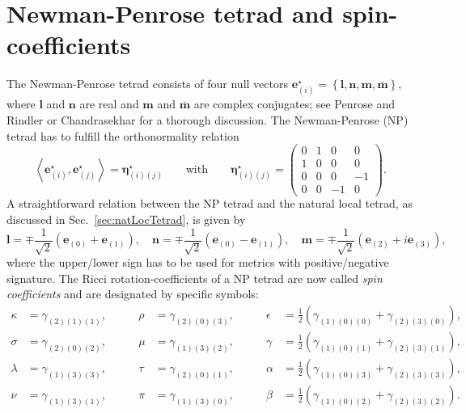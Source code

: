 \documentclass[10pt,twoside,notitlepage,a4paper,fleqn,openbib]{report}
\begin{document}
\section{Newman-Penrose tetrad and spin-coefficients}\label{sec:newmanPenrose}
\setcounter{equation}{0}
The Newman-Penrose tetrad consists of four null vectors $\mathbf{e}^{\star}_{(i)}=\left\{\mathbf{l}, \mathbf{n}, \mathbf{m}, \mathbf{\bar{m}}\right\}$, where $\mathbf{l}$ and $\mathbf{n}$ are real and $\mathbf{m}$ and $\mathbf{\bar{m}}$ are complex conjugates; see Penrose and Rindler\cite{penroseRindler} or Chandrasekhar\cite{chandrasekhar2006} for a thorough discussion. The Newman-Penrose (NP) tetrad has to fulfill the orthonormality relation
\begin{equation}
  \left<\mathbf{e}^{\star}_{(i)},\mathbf{e}^{\star}_{(j)}\right> = \boldsymbol{\eta}^{\star}_{(i)(j)}\qquad\text{with}\qquad \boldsymbol{\eta}^{\star}_{(i)(j)} = \left(\begin{array}{cccc} 0 & 1 & 0 & 0 \\ 1 & 0 & 0 & 0 \\ 0 & 0 & 0 & -1 \\ 0 & 0 & -1 & 0\end{array}\right). 
\end{equation}
A straightforward relation between the NP tetrad and the natural local tetrad, as discussed in  Sec.~\ref{sec:natLocTetrad}, is given by
\begin{equation}
  \mathbf{l}=\mp\frac{1}{\sqrt{2}}\left(\mathbf{e}_{(0)}+\mathbf{e}_{(1)}\right),\quad \mathbf{n}=\mp\frac{1}{\sqrt{2}}\left(\mathbf{e}_{(0)}-\mathbf{e}_{(1)}\right),\quad \mathbf{m}=\mp\frac{1}{\sqrt{2}}\left(\mathbf{e}_{(2)}+i\mathbf{e}_{(3)}\right),
\end{equation}
where the upper/lower sign has to be used for metrics with positive/negative signature. The Ricci rotation-coefficients of a NP tetrad are now called {\it spin coefficients} and are designated by specific symbols:
\begin{subequations}
\begin{alignat}{5}
 \kappa &= \gamma_{(2)(1)(1)}, &\qquad \rho &= \gamma_{(2)(0)(3)}, &\qquad \epsilon &= \frac{1}{2}\left(\gamma_{(1)(0)(0)}+\gamma_{(2)(3)(0)}\right),\\
 \sigma &= \gamma_{(2)(0)(2)}, &\qquad \mu &= \gamma_{(1)(3)(2)}, &\qquad \gamma &= \frac{1}{2}\left(\gamma_{(1)(0)(1)}+\gamma_{(2)(3)(1)}\right),\\
 \lambda &= \gamma_{(1)(3)(3)}, &\qquad \tau &= \gamma_{(2)(0)(1)}, &\qquad \alpha &= \frac{1}{2}\left(\gamma_{(1)(0)(3)}+\gamma_{(2)(3)(3)}\right),\\
 \nu &= \gamma_{(1)(3)(1)}, &\qquad \pi &= \gamma_{(1)(3)(0)}, &\qquad \beta &= \frac{1}{2}\left(\gamma_{(1)(0)(2)}+\gamma_{(2)(3)(2)}\right).
\end{alignat}
\end{subequations} 
\end{document}
